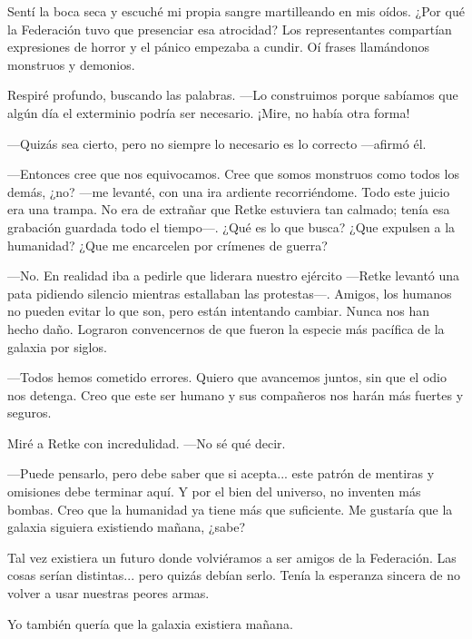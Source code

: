 Sentí la boca seca y escuché mi propia sangre martilleando en mis oídos. ¿Por qué la Federación tuvo que presenciar esa atrocidad? Los representantes compartían expresiones de horror y el pánico empezaba a cundir. Oí frases llamándonos monstruos y demonios.

Respiré profundo, buscando las palabras. —Lo construimos porque sabíamos que algún día el exterminio podría ser necesario. ¡Mire, no había otra forma!

—Quizás sea cierto, pero no siempre lo necesario es lo correcto —afirmó él.

—Entonces cree que nos equivocamos. Cree que somos monstruos como todos los demás, ¿no? —me levanté, con una ira ardiente recorriéndome. Todo este juicio era una trampa. No era de extrañar que Retke estuviera tan calmado; tenía esa grabación guardada todo el tiempo—. ¿Qué es lo que busca? ¿Que expulsen a la humanidad? ¿Que me encarcelen por crímenes de guerra?

—No. En realidad iba a pedirle que liderara nuestro ejército —Retke levantó una pata pidiendo silencio mientras estallaban las protestas—. Amigos, los humanos no pueden evitar lo que son, pero están intentando cambiar. Nunca nos han hecho daño. Lograron convencernos de que fueron la especie más pacífica de la galaxia por siglos.

—Todos hemos cometido errores. Quiero que avancemos juntos, sin que el odio nos detenga. Creo que este ser humano y sus compañeros nos harán más fuertes y seguros.

Miré a Retke con incredulidad. —No sé qué decir.

—Puede pensarlo, pero debe saber que si acepta... este patrón de mentiras y omisiones debe terminar aquí. Y por el bien del universo, no inventen más bombas. Creo que la humanidad ya tiene más que suficiente. Me gustaría que la galaxia siguiera existiendo mañana, ¿sabe?

Tal vez existiera un futuro donde volviéramos a ser amigos de la Federación. Las cosas serían distintas... pero quizás debían serlo. Tenía la esperanza sincera de no volver a usar nuestras peores armas.

Yo también quería que la galaxia existiera mañana.